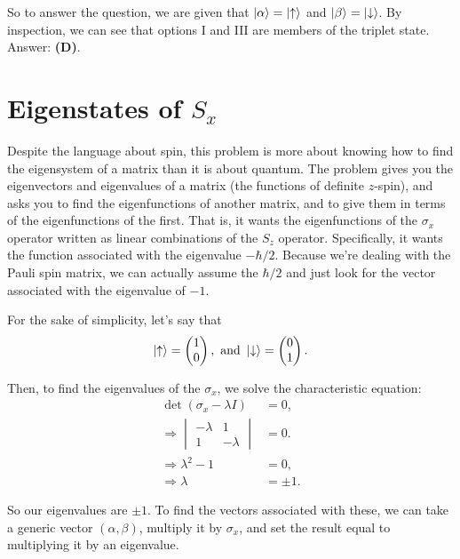 \documentclass[11pt]{paper}
\newcommand{\answer}[1]{Answer: \textbf{(#1)}.}
\begin{document}
So to answer the question, we are given that $\ket{\alpha} = \ket{\uparrow}$ and $\ket{\beta} = \ket{\downarrow}$.  By inspection, we can see that options I and III are members of the triplet state.\\

\answer{D}

\section{Eigenstates of $S_x$}
Despite the language about spin, this problem is more about knowing how to find the eigensystem of a matrix than it is about quantum.  The problem gives you the eigenvectors and eigenvalues of a matrix (the functions of definite $z$-spin), and asks you to find the eigenfunctions of another matrix, and to give them in terms of the eigenfunctions of the first.  That is, it wants the eigenfunctions of the $\sigma_x$ operator written as linear combinations of the $S_z$ operator.  Specifically, it wants the function associated with the eigenvalue $-\hbar/2$.  Because we're dealing with the Pauli spin matrix, we can actually assume the $\hbar/2$ and just look for the vector associated with the eigenvalue of $-1$.

For the sake of simplicity, let's say that
\begin{equation}
\ket{\uparrow} = 
\begin{pmatrix}
1\\0
\end{pmatrix},
\text{ and } 
\ket{\downarrow} = 
\begin{pmatrix}
0\\1
\end{pmatrix}.
\end{equation}

Then, to find the eigenvalues of the $\sigma_x$, we solve the characteristic equation:
\begin{align}
\det\left(\sigma_x - \lambda I\right) &= 0,\\
\Rightarrow \begin{vmatrix}
-\lambda & 1\\
1 & -\lambda
\end{vmatrix}
&=0.\\
\Rightarrow \lambda^2 -1&= 0,\\
\Rightarrow \lambda &= \pm 1.
\end{align}

So our eigenvalues are $\pm1$.  To find the vectors associated with these, we can take a generic vector $(\alpha,\beta)$, multiply it by $\sigma_x$, and set the result equal to multiplying it by an eigenvalue.
\end{document}
